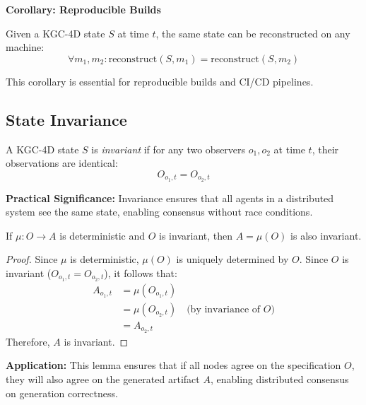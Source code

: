 \textbf{Corollary: Reproducible Builds}

Given a KGC-4D state \(S\) at time \(t\), the same state can be reconstructed on any machine:
\begin{equation}
    \forall m_1, m_2: \text{reconstruct}(S, m_1) = \text{reconstruct}(S, m_2)
\end{equation}

This corollary is essential for reproducible builds and CI/CD pipelines.

\subsection{State Invariance}

\begin{definition}
    A KGC-4D state \(S\) is \textit{invariant} if for any two observers \(o_1, o_2\) at time \(t\), their observations are identical:
    \begin{equation}
        O_{o_1,t} = O_{o_2,t}
    \end{equation}
\end{definition}

\textbf{Practical Significance:} Invariance ensures that all agents in a distributed system see the same state, enabling consensus without race conditions.

\begin{lemma}
    If \(\mu: O \rightarrow A\) is deterministic and \(O\) is invariant, then \(A = \mu(O)\) is also invariant.
\end{lemma}

\begin{proof}
    Since \(\mu\) is deterministic, \(\mu(O)\) is uniquely determined by \(O\). Since \(O\) is invariant (\(O_{o_1,t} = O_{o_2,t}\)), it follows that:
    \begin{align}
        A_{o_1,t} &= \mu(O_{o_1,t}) \\
                  &= \mu(O_{o_2,t}) \quad \text{(by invariance of \(O\))} \\
                  &= A_{o_2,t}
    \end{align}
    Therefore, \(A\) is invariant.
\end{proof}

\textbf{Application:} This lemma ensures that if all nodes agree on the specification \(O\), they will also agree on the generated artifact \(A\), enabling distributed consensus on generation correctness.


